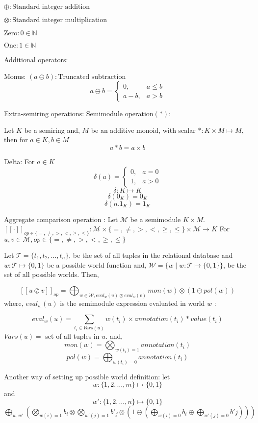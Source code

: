 \documentclass{article}
\begin{document}
$\oplus : \text{Standard integer addition}$

$\otimes : \text{Standard integer multiplication}$

$\text{Zero} : 0 \in \mathbb{N}$

$\text{One} : 1 \in \mathbb{N}$

Additional operators:

Monus: $(a \ominus b): \text{Truncated subtraction}$
$$ a \ominus b = \begin{cases} 0, &  a\leq b\\ a-b,& a>b \end{cases}$$

Extra-semiring operations:
Semimodule operation$(*)$:

Let $K$ be a semiring and, $M$ be an additive monoid, with scalar $*:K\times M \mapsto M$, then for $a \in K, b \in M$
$$a * b = a \times b$$


Delta: 
For $a \in K$
$$\delta(a) = \begin{cases} 0, & a=0\\ 1, & a>0 \end{cases}$$
$$\delta:K \mapsto K $$
$$\delta(0_K)=0_K$$
$$\delta(n.1_K)=1_K$$

Aggregate comparison operation : \newline
Let $\mathcal{M}$ be a semimodule $K\times M$.
$[[\cdot]]_{\mathit{op}\in\{ =, \neq , >, <, \geq, \leq\}}: \mathcal{M} \times \{ =, \neq , >, <, \geq, \leq\} \times \mathcal{M} \rightarrow K$
For $u,v\in \mathcal{M}, op \in \{ =, \neq , >, <, \geq, \leq\}$  





Let $\mathcal{T} = \{t_1, t_2, \dots, t_n\}$, be the set of all tuples in the relational database and $w: \mathcal{T} \mapsto \{0,1\}$ be a possible world function and,
$\mathcal{W} = \{w \mid w:\mathcal{T} \mapsto \{0,1\}\}$, be the set of all possible worlds.
Then,

$$ [[u \oslash v]]_{op}= \bigoplus_{w \in \mathcal{W},{eval_w(u) \oslash eval_w(v)}} mon(w)\otimes\left(1 \ominus pol(w)\right)$$
where,
$eval_w(u)$ is the semimodule expression evaluated in world $w$ :

$$eval_{w}(u) = \sum_{t_i\in Vars(u)} w(t_i)\times annotation(t_i)*value(t_i)$$
$Vars(u) =$ set of all tuples in $u$.
and,
$$ mon(w)=\bigotimes_{w(t_i)=1}annotation(t_i)$$
$$pol(w)=\bigoplus_{w(t_i)=0}annotation(t_i)$$



Another way of setting up possible world definition:\newline
let $$w: \{1,2,\dots,m\} \mapsto \{0,1\}$$ and $$w': \{1,2,\dots,n\} \mapsto \{0,1\}$$
$\bigoplus_{w,w'}\left(\bigotimes_{w(i)=1}b_i\otimes\bigotimes_{w'(j) = 1}b'_j\otimes\left(1\ominus(\bigoplus_{w(i) =0}b_i\oplus \bigoplus_{w'(j) = 0}b'j)\right)\right)$
\end{document}
